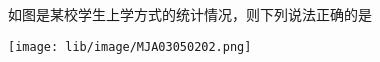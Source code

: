 如图是某校学生上学方式的统计情况，则下列说法正确的是\key{}
\begin{center}
    \texttt{[image: lib/image/MJA03050202.png]}
\end{center}